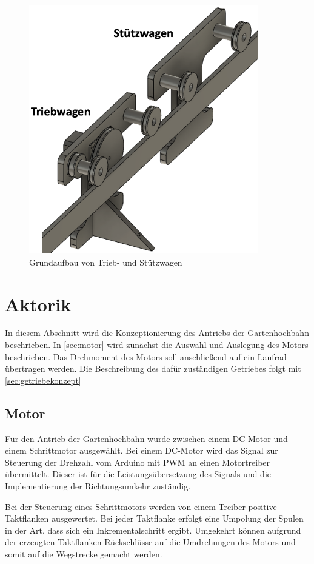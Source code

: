 \begin{figure}[h]
	\centering
	\includegraphics[width=10cm]{grundaufbau.png} 
	\caption{Grundaufbau von Trieb- und Stützwagen}
	\label{pic:grundaufbau}
\end{figure}


\section{Aktorik}
In diesem Abschnitt wird die Konzeptionierung des Antriebs der Gartenhochbahn beschrieben. In \autoref{sec:motor} wird zunächst die Auswahl und Auslegung des Motors beschrieben. Das Drehmoment des Motors soll anschließend auf ein Laufrad übertragen werden. Die Beschreibung des dafür zuständigen Getriebes folgt mit \autoref{sec:getriebekonzept}

\subsection{Motor}
\label{sec:motor}
Für den Antrieb der Gartenhochbahn wurde zwischen einem DC-Motor und einem Schrittmotor ausgewählt. 
Bei einem DC-Motor wird das Signal zur Steuerung der Drehzahl vom Arduino mit PWM an einen Motortreiber übermittelt. Dieser ist für die Leistungsübersetzung des Signals und die Implementierung der Richtungsumkehr zuständig. 

Bei der Steuerung eines Schrittmotors werden von einem Treiber positive Taktflanken ausgewertet. Bei jeder Taktflanke erfolgt eine Umpolung der Spulen in der Art, dass sich ein Inkrementalschritt ergibt. Umgekehrt können aufgrund der erzeugten Taktflanken Rückschlüsse auf die Umdrehungen des Motors und somit auf die Wegstrecke gemacht werden. 

